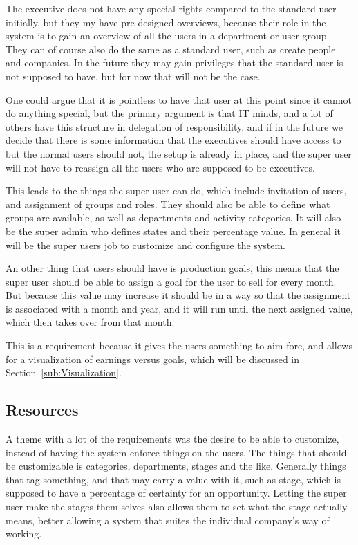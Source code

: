 The executive does not have any special rights compared to the standard user
initially, but they my have pre-designed overviews, because their role in the
system is to gain an overview of all the users in a department or user
group. They can of course also do the same as a standard user, such as create
people and companies. In the future they may gain privileges that the standard
user is not supposed to have, but for now that will not be the case. 

One could argue that it is pointless to have that user at this point since it
cannot do anything special, but the primary argument is that IT minds, and a lot
of others have this structure in delegation of responsibility, and if in the
future we decide that there is some information that the executives should have
access to but the normal users should not, the setup is already in place, and
the super user will not have to reassign all the users who are supposed to be
executives. 

This leads to the things the super user can do, which include invitation of
users, and assignment of groups and roles. They should also be able to define
what groups are available, as well as departments and activity categories. It
will also be the super admin who defines states and their percentage value. In
general it will be the super users job to customize and configure the system.

An other thing that users should have is production goals, this means that the
super user should be able to assign a goal for the user to sell for every month.
But because this value may increase it should be in a way so that the assignment
is associated with a month and year, and it will run until the next assigned
value, which then takes over from that month. 

This is a requirement because it gives the users something to aim fore, and
allows for a visualization of earnings versus goals, which will be discussed in
Section~\ref{sub:Visualization}.

\subsection{Resources}
\label{sub:Resources}

A theme with a lot of the requirements was the desire to be able to customize,
instead of having the system enforce things on the users. The things that should
be customizable is categories, departments, stages and the like. Generally
things that tag something, and that may carry a value with it, such as stage,
which is supposed to have a percentage of certainty for an opportunity. Letting
the super user make the stages them selves also allows them to set what the
stage actually means, better allowing a system that suites the individual
company's way of working. 

